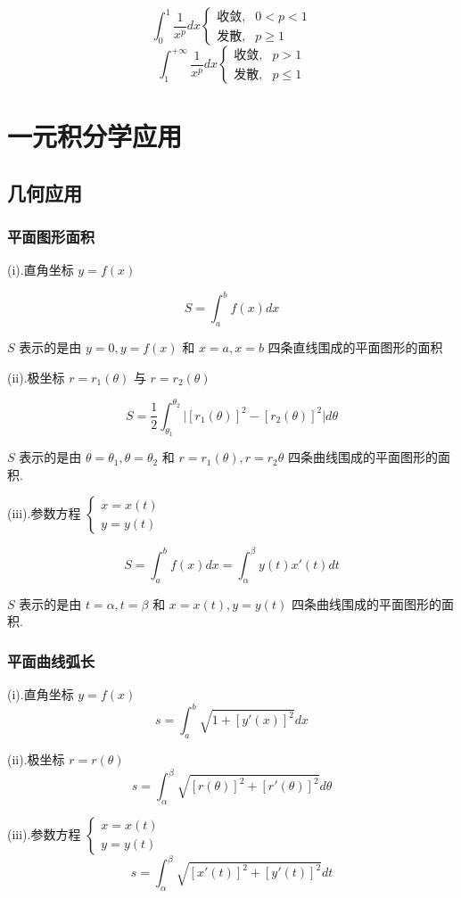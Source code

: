 \begin{corollary}[p级数判别法]
	$$\int_{0}^{1}\frac{1}{x^{p}}dx\begin{cases} \text{收敛}, &0 < p < 1 \\ \text{发散},& p\geq 1  \end{cases}$$
	$$\int_{1}^{+\infty}\frac{1}{x^{p}}dx\begin{cases} \text{收敛}, &p > 1 \\ \text{发散},& p\leq 1  \end{cases}$$
\end{corollary}

\section{一元积分学应用}

\subsection{几何应用}
\subsubsection{平面图形面积}
\begin{definition}[定积分几何意义]

	(i).直角坐标 $y=f(x)$

	$$S=\int_{a}^{b}f(x)dx$$

	$S$ 表示的是由 $y=0,y=f(x)$ 和 $x=a,x=b$ 四条直线围成的平面图形的面积

	(ii).极坐标 $r=r_{1}(\theta)$ 与 $r=r_{2}(\theta)$

	$$S=\dfrac{1}{2}\int_{\theta_{1}}^{\theta_{2}}\big|[r_{1}(\theta)]^{2}-[r_{2}(\theta)]^{2}\big|d\theta$$

	$S$ 表示的是由 $\theta=\theta_{1},\theta=\theta_{2}$ 和 $r=r_{1}(\theta),r=r_{2}\theta$ 四条曲线围成的平面图形的面积.

	(iii).参数方程 
	$\begin{cases}
		x=x(t) \\
		y=y(t)
	\end{cases}$

	$$S=\int_{a}^{b}f(x)dx = \int_{\alpha}^{\beta}y(t)x'(t)dt$$

	$S$ 表示的是由 $t=\alpha,t=\beta$ 和 $x=x(t),y=y(t)$ 四条曲线围成的平面图形的面积.
	
\end{definition}
\subsubsection{平面曲线弧长}
\begin{theorem}[平面曲线的弧长]

	(i).直角坐标 $y=f(x)$
	$$s=\int_{a}^{b}\sqrt{1+[y'(x)]^{2}}dx$$

	(ii).极坐标 $r=r(\theta)$
	$$s=\int_{\alpha}^{\beta}\sqrt{[r(\theta)]^{2}+[r'(\theta)]^{2}}d\theta$$

	(iii).参数方程 $\begin{cases}
		x=x(t) \\
		y=y(t)
	\end{cases}$
	$$s=\int_{\alpha}^{\beta}\sqrt{[x'(t)]^{2}+[y'(t)]^{2}}dt$$
\end{theorem}
